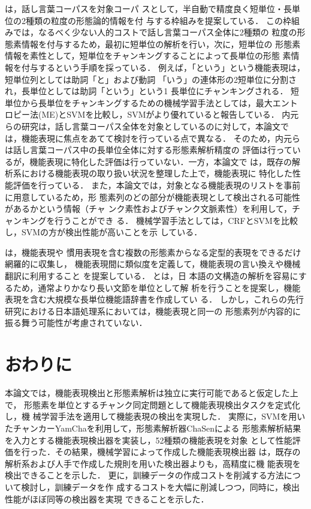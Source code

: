 \documentclass[japanese]{jnlp_1.2d}
\begin{document}
\cite{Uchimoto04aj,Uchimoto04}は，話し言葉コーパス\cite{CSJ}を対象コーパ
スとして，半自動で精度良く短単位・長単位の2種類の粒度の形態論的情報を付
与する枠組みを提案している．
この枠組みでは，なるべく少ない人的コストで話し言葉コーパス全体に2種類の
粒度の形態素情報を付与するため，最初に短単位の解析を行い，次に，短単位の
形態素情報を素性として，短単位をチャンキングすることによって長単位の形態
素情報を付与するという手順を採っている．
例えば，「という」という機能表現は，短単位列としては助詞「と」および動詞
「いう」の連体形の2短単位に分割され，長単位としては助詞「という」という1 
長単位にチャンキングされる．
短単位から長単位をチャンキングするための機械学習手法としては，最大エント
ロピー法(ME)とSVMを比較し，SVMがより優れていると報告している．
内元らの研究は，話し言葉コーパス全体を対象としているのに対して，本論文で
は，機能表現に焦点をあてて検討を行っている点で異なる．
そのため，内元らは話し言葉コーパス中の長単位全体に対する形態素解析精度の
評価は行っているが，機能表現に特化した評価は行っていない．一方，本論文で
は，既存の解析系における機能表現の取り扱い状況を整理した上で，機能表現に
特化した性能評価を行っている．
また，本論文では，対象となる機能表現のリストを事前に用意しているため，形
態素列のどの部分が機能表現として検出される可能性があるかという情報（チャ
ンク素性およびチャンク文脈素性）を利用して，チャンキングを行うことができ
る．
機械学習手法としては，CRFとSVMを比較し，SVMの方が検出性能が高いことを示
している．

\cite{shudo.coling80,shudo.NL88,shudo.NLC98,shudo.mwe2004}は，機能表現や
慣用表現を含む複数の形態素からなる定型的表現をできるだけ網羅的に収集し，
機能表現間に類似度を定義して，機能表現の言い換えや機械翻訳に利用すること
を提案している．
\cite{hyoudo.NLC98,hyoudo.NLP99,hyoudo.NLP00}と\cite{isaji.NLP04}は，日
本語の文構造の解析を容易にするため，通常よりかなり長い文節を単位として解
析を行うことを提案し，機能表現を含む大規模な長単位機能語辞書を作成してい
る．
しかし，これらの先行研究における日本語処理系においては，機能表現と同一の
形態素列が内容的に振る舞う可能性が考慮されていない．


\section{おわりに}
\label{sec:おわりに}

本論文では，機能表現検出と形態素解析は独立に実行可能であると仮定した上で，
形態素を単位とするチャンク同定問題として機能表現検出タスクを定式化し，機
械学習手法を適用して機能表現の検出を実現した．
実際に，SVMを用いたチャンカーYamChaを利用して，形態素解析器ChaSenによる
形態素解析結果を入力とする機能表現検出器を実装し，52種類の機能表現を対象
として性能評価を行った．その結果，機械学習によって作成した機能表現検出器
は，既存の解析系および人手で作成した規則を用いた検出器よりも，高精度に機
能表現を検出できることを示した．
更に，訓練データの作成コストを削減する方法について検討し，訓練データを作
成するコストを大幅に削減しつつ，同時に，検出性能がほぼ同等の検出器を実現
できることを示した．
\end{document}
